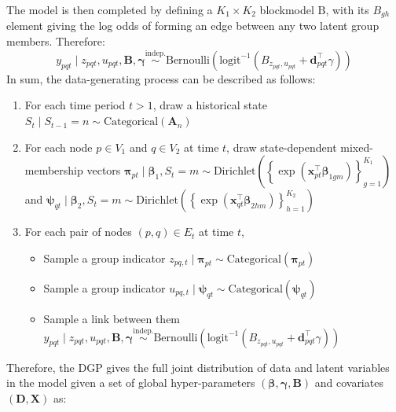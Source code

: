 \documentclass{article}
\begin{document}
The model is then completed by defining a $K_1 \times K_2$ blockmodel $\mathrm{B}$, with its $B_{gh}$ element giving the log odds of forming an edge between any two latent group members. Therefore:
$$
y_{pqt} \mid z_{pqt}, u_{pqt}, \mathbf{B}, \boldsymbol{\gamma} \stackrel{\mathrm{indep.}}{\sim} \mathrm{Bernoulli}\left( \mathrm{logit}^{-1}(B_{z_{pqt}, u_{pqt}} + \mathbf{d}_{pqt}^\top \gamma) \right)
$$
In sum, the data-generating process can be described as follows:
\begin{enumerate}
    \item For each time period $t > 1$, draw a historical state $S_t \mid S_{t-1} = n \sim \mathrm{Categorical}(\mathbf{A}_n)$
    \item For each node $p \in V_1$ and $q \in V_2$ at time $t$, draw state-dependent mixed-membership vectors $\boldsymbol{\pi}_{pt} \mid \boldsymbol{\beta}_1, S_t = m \sim \mathrm{Dirichlet}\left( \left\{ \exp(\mathbf{x}_{pt}^\top \boldsymbol{\beta}_{1gm}) \right\}_{g=1}^{K_1}\right)$ and $\boldsymbol{\psi}_{qt} \mid \boldsymbol{\beta}_2, S_t = m \sim \mathrm{Dirichlet}\left( \left\{ \exp(\mathbf{x}_{qt}^\top \boldsymbol{\beta}_{2hm}) \right\}_{h=1}^{K_2}\right)$
    \item For each pair of nodes $(p,q) \in E_t$ at time $t$,
        \begin{itemize}
            \item Sample a group indicator  $z_{pq,t} \mid \boldsymbol{\pi}_{pt} \sim \mathrm{Categorical}(\boldsymbol{\pi}_{pt})$
            \item Sample a group indicator $u_{pq,t} \mid \boldsymbol{\psi}_{qt} \sim \mathrm{Categorical}(\boldsymbol{\psi}_{qt})$
            \item Sample a link between them $y_{pqt} \mid z_{pqt}, u_{pqt}, \mathbf{B}, \boldsymbol{\gamma} \stackrel{\mathrm{indep.}}{\sim} \mathrm{Bernoulli}\left( \mathrm{logit}^{-1}(B_{z_{pqt}, u_{pqt}} + \mathbf{d}_{pqt}^\top \gamma) \right)$
        \end{itemize}
\end{enumerate}

Therefore, the DGP gives the full joint distribution of data and latent variables in the model given a set of global hyper-parameters $(\boldsymbol{\beta, \gamma}, \mathbf{B})$ and covariates $(\mathbf{D,X})$ as: 
\end{document}
